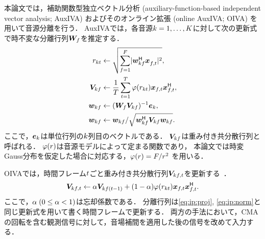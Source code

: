 \documentclass[sip,biber]{now-journal}
\begin{document}
本論文では，補助関数型独立ベクトル分析 (auxiliary-function-based independent vector analysis; AuxIVA) \cite{Ono:2011:WASPAA}
およびそのオンライン拡張 (online AuxIVA; OIVA) \cite{Taniguchi:2014:HSCMA} を用いて音源分離を行う．
AuxIVAでは，各音源$k = 1, \dots, K$に対して次の更新式で時不変な分離行列$\bm{W} _{f}$を推定する．
\begin{align}
  \var _{\src\tframe} &\gets \sqrt{\sum _{\freq=1} ^{\Freq} \lvert \demix ^{\hermite} _{\src\freq} \Obs ^{\nohermite}_{\ft} \rvert ^2}, \\
  \cov _{\src\freq} &\gets \frac{1}{\Tframe} \sum _{\tframe=1} ^{\Tframe} \weight (\var_{\src\tframe}) \Obs _{\ft} \Obs _{\ft}^{\hermite}, \\
  \demix _{\src\freq} &\gets (\Demix _{\freq} \cov _{\src\freq}) ^{-1} \eye _{\src} \label{eq:ip:proj}, \\
  \demix _{\src\freq} &\gets {\demix _{\src\freq}} / {\sqrt{\demix _{\src\freq} ^{\hermite} \cov _{\src\freq} \demix _{\src\freq}}} \label{eq:ip:norm}.
\end{align}
ここで，$\bm{e} _{k}$は単位行列の$k$列目のベクトルである．
$\bm{V} _{kf}$は{重み付き共分散行列}と呼ばれる．
$\varphi(r)$は音源モデルによって定まる関数であり，
本論文では時変Gauss分布を仮定した場合に対応する，$\varphi (r) = F/{r ^2}$ \cite{Ono:2012:APSIPA}を用いる．

OIVAでは，時間フレーム$t$ごと重み付き共分散行列$\cov _{\src\ft}$を更新する~\cite{Taniguchi:2014:HSCMA}．
\begin{equation}
  \cov _{\src\ft} \gets \forget \cov _{\src\freq(\tframe-1)} + (1 - \forget) \weight ({\var _{\src\tframe}}) \Obs _{\ft} \Obs _{\ft}^{\hermite}.
\end{equation}
ここで，$\alpha\; (0 \leq \alpha < 1)$は忘却係数である．
分離行列は\cref{eq:ip:proj}, \cref{eq:ip:norm}と同じ更新式を用いて書く時間フレームで更新する．
両方の手法において，CMAの回転を含む観測信号に対して，音場補間を適用した後の信号を改めて入力する．

\end{document}
